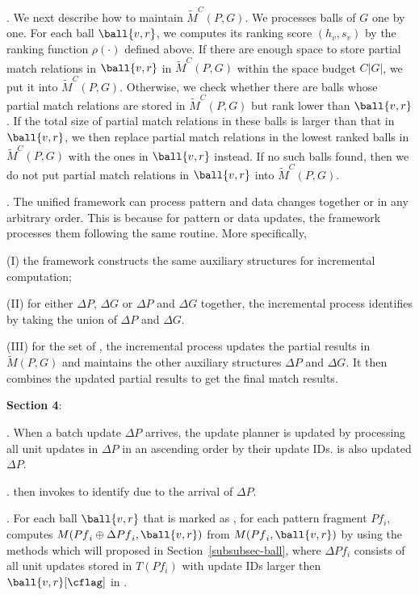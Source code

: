 .
We next describe how to maintain $\tilde{M}^C(P,G)$. We processes balls of $G$ one by one. For each ball $\ball{v,r}$, we computes its ranking score $(h_v, s_v)$ by the ranking function $\rho(\cdot)$ defined above.
If there are enough space to store partial match relations in $\ball{v,r}$ in $\tilde{M}^C(P,G)$ within the space budget $C|G|$, we put it into $\tilde{M}^C(P,G)$. Otherwise, we check whether there are balls whose partial match relations are stored in $\tilde{M}^C(P,G)$ but rank lower than $\ball{v,r}$. If the total size of partial match relations in these balls is larger than that in $\ball{v,r}$, we then replace partial match relations in the lowest ranked balls in $\tilde{M}^C(P,G)$ with the ones in $\ball{v,r}$ instead. If no such balls found, then we do not put partial match relations in $\ball{v,r}$ into $\tilde{M}^C(P,G)$.



. The unified framework can process pattern and data changes together or in any arbitrary order. This is because for pattern or data updates, the framework processes them following the same routine. More specifically,

\sstab (I) the framework constructs the same auxiliary structures \fbmatstruct for incremental computation;

\sstab (II) for either $\Delta P$, $\Delta G$ or $\Delta P$ and $\Delta G$ together, the incremental process identifies \affballsx by taking the union of \affballsx \wrt $\Delta P$ and \affballsx \wrt $\Delta G$.

\sstab (III) for the set of \affballsx, the incremental process updates the partial results in $\tilde{M}(P,G)$ and maintains the other auxiliary structures \wrt $\Delta P$ and $\Delta G$. It then combines the updated partial results to get the final match results.


{\bf Section 4}:

\stab
{}. When a batch update $\Delta P$ arrives, the update planner is updated by processing all unit updates in $\Delta P$ in an ascending order by their update IDs. \ballfilter is also updated \wrt $\Delta P$.

\stab
{}. \patinc then invokes \identifyaffball to identify \affballsx due to the arrival of $\Delta P$.

\stab
{}. For each ball $\ball{v,r}$ that is marked as \affballx, for each pattern fragment ${Pf}_i$, computes $M({Pf}_i\oplus \Delta {Pf}_i, \ball{v,r})$ from $M({Pf}_i, \ball{v,r})$ by using the methods which will proposed in Section~\ref{subsubsec-ball}, where $\Delta {Pf}_i$ consists of all unit updates stored in $T({Pf}_i)$ with update IDs larger then $\ball{v,r}[\cflag]$ in \matchindex.

